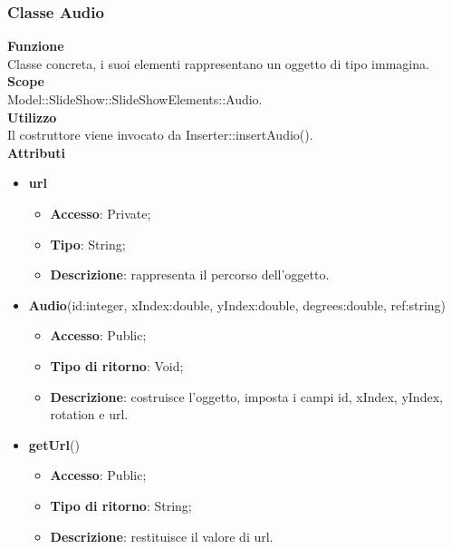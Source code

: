 {	\subsubsection{Classe Audio}{
		\label{Audio}
		\textbf{Funzione}\\
			\indent Classe concreta, i suoi elementi rappresentano un oggetto di tipo immagina.\\
	   	\textbf{Scope}\\
			\indent Model::SlideShow::SlideShowElements::Audio.\\
		\textbf{Utilizzo}\\
			\indent Il costruttore viene invocato da Inserter::insertAudio().\\
		\textbf{Attributi}
		\begin{itemize}
			\item \textbf{url}
			\begin{itemize}
				\item \textbf{Accesso}: Private;
				\item \textbf{Tipo}: String;
				\item \textbf{Descrizione}: rappresenta il percorso dell’oggetto.
			\end{itemize}
		\end{itemize}
		\begin{itemize}
			\item \textbf{Audio}(id:integer, xIndex:double, yIndex:double, degrees:double, ref:string)
			\begin{itemize}
				\item \textbf{Accesso}: Public;
				\item \textbf{Tipo di ritorno}: Void;
				\item \textbf{Descrizione}: costruisce l’oggetto, imposta i campi id, xIndex, yIndex, rotation e url.
			\end{itemize}
			\item \textbf{getUrl}()
			\begin{itemize}
				\item \textbf{Accesso}: Public;
				\item \textbf{Tipo di ritorno}: String;
				\item \textbf{Descrizione}: restituisce il valore di url.
			\end{itemize}
		\end{itemize}
		}
	
}
